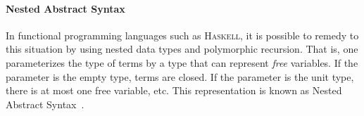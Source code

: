 \documentclass[9pt,preprint,authoryear]{sigplanconf}
\begin{document}
\paragraph*{Nested Abstract Syntax}

%
In functional programming languages such as \textsc{Haskell}, it is
    possible to remedy to this situation by using nested data types
    and polymorphic recursion. That is, one parameterizes the type of
    terms by a type that can represent \emph{free} variables. If the
    parameter is the empty type, terms are closed. If the parameter is
    the unit type, there is at most one free variable, etc.
    This representation is known as Nested Abstract
    Syntax{~}\cite{bellegarde-94,bird-paterson-99,altenkirch-reus-99}.%


{\nopagebreak }
\end{document}
